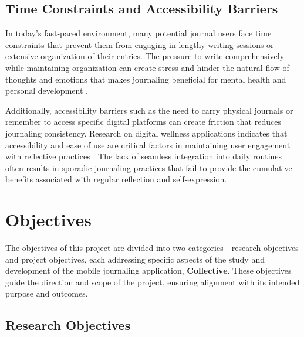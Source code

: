 \subsection{Time Constraints and Accessibility Barriers}\label{subsec:time-constraints}

In today's fast-paced environment, many potential journal users face time constraints that prevent them from engaging in lengthy writing sessions or extensive organization of their entries. The pressure to write comprehensively while maintaining organization can create stress and hinder the natural flow of thoughts and emotions that makes journaling beneficial for mental health and personal development \cite{pennebaker1999forming}.

Additionally, accessibility barriers such as the need to carry physical journals or remember to access specific digital platforms can create friction that reduces journaling consistency. Research on digital wellness applications indicates that accessibility and ease of use are critical factors in maintaining user engagement with reflective practices \cite{sloan2015efficacy}. The lack of seamless integration into daily routines often results in sporadic journaling practices that fail to provide the cumulative benefits associated with regular reflection and self-expression.

\section{Objectives}\label{sec:objectives}

The objectives of this project are divided into two categories - research objectives and project objectives, each addressing specific aspects of the study and development of the mobile journaling application, \textbf{Collective}. These objectives guide the direction and scope of the project, ensuring alignment with its intended purpose and outcomes.

\subsection{Research Objectives}\label{subsec:research-objectives}

